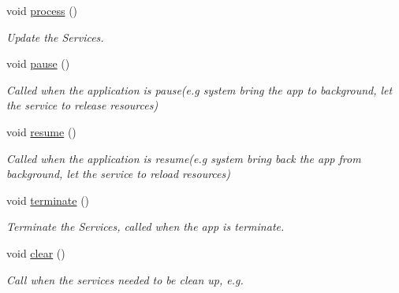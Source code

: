 \begin{DoxyCompactItemize}
\item 
void \hyperlink{class_magnum_1_1_scene_1_1_factory_ac6a15b3af44e3f3bd58a497c5123378d}{process} ()\hypertarget{class_magnum_1_1_scene_1_1_factory_ac6a15b3af44e3f3bd58a497c5123378d}{}\label{class_magnum_1_1_scene_1_1_factory_ac6a15b3af44e3f3bd58a497c5123378d}

\begin{DoxyCompactList}\small\item\em Update the Services. \end{DoxyCompactList}\item 
void \hyperlink{class_magnum_1_1_scene_1_1_factory_ae0fa7f6a0b0ec4cb91a0ae4ad3a6beb0}{pause} ()\hypertarget{class_magnum_1_1_scene_1_1_factory_ae0fa7f6a0b0ec4cb91a0ae4ad3a6beb0}{}\label{class_magnum_1_1_scene_1_1_factory_ae0fa7f6a0b0ec4cb91a0ae4ad3a6beb0}

\begin{DoxyCompactList}\small\item\em Called when the application is pause(e.\+g system bring the app to background, let the service to release resources) \end{DoxyCompactList}\item 
void \hyperlink{class_magnum_1_1_scene_1_1_factory_a989d01f9c75f8667a160ca9900820ad9}{resume} ()\hypertarget{class_magnum_1_1_scene_1_1_factory_a989d01f9c75f8667a160ca9900820ad9}{}\label{class_magnum_1_1_scene_1_1_factory_a989d01f9c75f8667a160ca9900820ad9}

\begin{DoxyCompactList}\small\item\em Called when the application is resume(e.\+g system bring back the app from background, let the service to reload resources) \end{DoxyCompactList}\item 
void \hyperlink{class_magnum_1_1_scene_1_1_factory_a9290a74d918072b2756a396ef237ee4a}{terminate} ()\hypertarget{class_magnum_1_1_scene_1_1_factory_a9290a74d918072b2756a396ef237ee4a}{}\label{class_magnum_1_1_scene_1_1_factory_a9290a74d918072b2756a396ef237ee4a}

\begin{DoxyCompactList}\small\item\em Terminate the Services, called when the app is terminate. \end{DoxyCompactList}\item 
void \hyperlink{class_magnum_1_1_scene_1_1_factory_a131e14fe14f6bb4b1689cd428f1439c9}{clear} ()
\begin{DoxyCompactList}\small\item\em Call when the services needed to be clean up, e.\+g. \end{DoxyCompactList}\end{DoxyCompactItemize}
